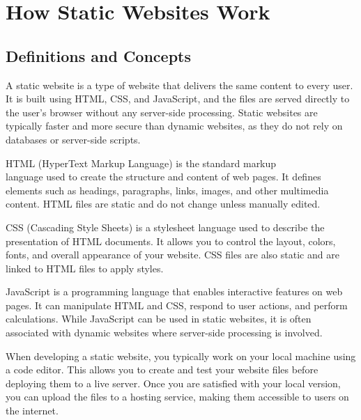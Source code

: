 
\newpage
\section{How Static Websites Work}

\subsection{Definitions and Concepts}
\begin{definition}
A static website is a type of website that delivers the same content to every user. It is built using HTML, CSS, and JavaScript, and the files are served directly to the user's browser without any server-side processing. Static websites are typically faster and more secure than dynamic websites, as they do not rely on databases or server-side scripts.
\end{definition}

\begin{definition}[HTML]
HTML (HyperText Markup Language) is the standard markup \\ language used to create the structure and content of web pages. It defines elements such as headings, paragraphs, links, images, and other multimedia content. HTML files are static and do not change unless manually edited.%
\end{definition}

\begin{definition}[CSS]
CSS (Cascading Style Sheets) is a stylesheet language used to describe the presentation of HTML documents. It allows you to control the layout, colors, fonts, and overall appearance of your website. CSS files are also static and are linked to HTML files to apply styles.
\end{definition}

\begin{definition}[JavaScript]
JavaScript is a programming language that enables interactive features on web pages. It can manipulate HTML and CSS, respond to user actions, and perform calculations. While JavaScript can be used in static websites, it is often associated with dynamic websites where server-side processing is involved.
\end{definition}

\begin{concept}
When developing a static website, you typically work on your local machine using a code editor. This allows you to create and test your website files before deploying them to a live server. Once you are satisfied with your local version, you can upload the files to a hosting service, making them accessible to users on the internet.
\end{concept}

